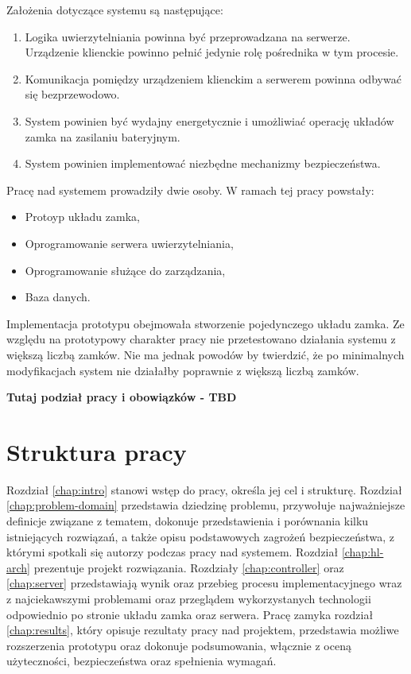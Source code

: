 		Założenia dotyczące systemu są następujące:

		\begin{enumerate}
		    \item Logika uwierzytelniania powinna być przeprowadzana na serwerze. Urządzenie klienckie powinno pełnić jedynie rolę pośrednika w tym procesie.
		    \item Komunikacja pomiędzy urządzeniem klienckim a serwerem powinna odbywać się bezprzewodowo.
		    \item System powinien być wydajny energetycznie i umożliwiać operację układów zamka na zasilaniu bateryjnym.
		    \item System powinien implementować niezbędne mechanizmy bezpieczeństwa.
		\end{enumerate}

		Pracę nad systemem prowadziły dwie osoby. W ramach tej pracy powstały:

		\begin{itemize}
		    \item Protoyp układu zamka,
		    \item Oprogramowanie serwera uwierzytelniania,
		    \item Oprogramowanie służące do zarządzania,
		    \item Baza danych.
		\end{itemize}

		Implementacja prototypu obejmowała stworzenie pojedynczego układu zamka. Ze względu na prototypowy charakter pracy nie przetestowano działania systemu z większą liczbą zamków. Nie ma jednak powodów by twierdzić, że po minimalnych modyfikacjach system nie działałby poprawnie z większą liczbą zamków.

		\textbf{Tutaj podział pracy i obowiązków - TBD}

	\section{Struktura pracy}

		Rozdział \ref{chap:intro} stanowi wstęp do pracy, określa jej cel i strukturę. Rozdział \ref{chap:problem-domain} przedstawia dziedzinę problemu, przywołuje najważniejsze definicje związane z tematem, dokonuje przedstawienia i porównania kilku istniejących rozwiązań, a także opisu podstawowych zagrożeń bezpieczeństwa, z którymi spotkali się autorzy podczas pracy nad systemem. Rozdział \ref{chap:hl-arch} prezentuje projekt rozwiązania. Rozdziały \ref{chap:controller} oraz \ref{chap:server} przedstawiają wynik oraz przebieg procesu implementacyjnego wraz z najciekawszymi problemami oraz przeglądem wykorzystanych technologii odpowiednio po stronie układu zamka oraz serwera. Pracę zamyka rozdział \ref{chap:results}, który opisuje rezultaty pracy nad projektem, przedstawia możliwe rozszerzenia prototypu oraz dokonuje podsumowania, włącznie z oceną użyteczności, bezpieczeństwa oraz spełnienia wymagań.